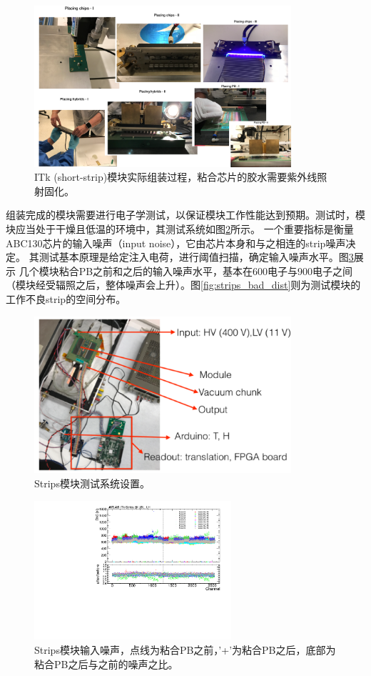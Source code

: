 \begin{figure}[h]
\centering
 \includegraphics[width=0.85\textwidth]{fig/strips_module_assembly.png}
 \caption{ITk (short-strip)模块实际组装过程，粘合芯片的胶水需要紫外线照射固化。}
 \label{fig:strip_moduel_assembly}
\end{figure}
组装完成的模块需要进行电子学测试，以保证模块工作性能达到预期。测试时，模块应当处于干燥且低温的环境中，其测试系统如图\ref{fig:strips_testing_setup}所示。
一个重要指标是衡量ABC130芯片的输入噪声（input noise），它由芯片本身和与之相连的strip噪声决定。
其测试基本原理是给定注入电荷，进行阈值扫描，确定输入噪声水平。图\ref{fig:strips_testing_noise}展示
几个模块粘合PB之前和之后的输入噪声水平，基本在600电子与900电子之间（模块经受辐照之后，整体噪声会上升）。图\ref{fig:strips_bad_dist}则为测试模块的
工作不良strip的空间分布。
\begin{figure}[h]
\centering
 \includegraphics[width=0.85\textwidth]{fig/strips_module_setup.png}
 \caption{Strips模块测试系统设置。}
 \label{fig:strips_testing_setup}
\end{figure}
\begin{figure}[h]
\centering
 \includegraphics[width=0.65\textwidth, angle=-90]{fig/LH_noise.pdf}
 \caption{Strips模块输入噪声，点线为粘合PB之前，'+'为粘合PB之后，底部为粘合PB之后与之前的噪声之比。}
 \label{fig:strips_testing_noise}
\end{figure}
